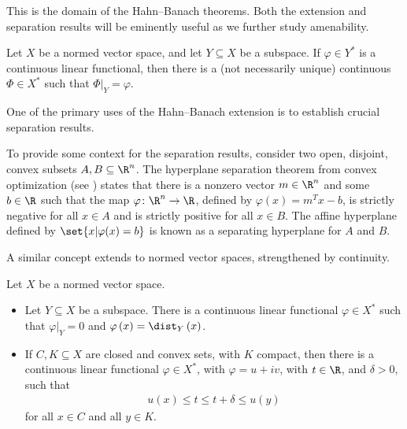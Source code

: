 \documentclass[10pt]{mypackage2}
\begin{document}
This is the domain of the Hahn--Banach theorems. Both the extension and separation results will be eminently useful as we further study amenability.
\begin{theorem}\label{thm:hahn_banach_extension}
  Let $X$ be a normed vector space, and let $Y\subseteq X$ be a subspace. If $\varphi\in Y^{\ast}$ is a continuous linear functional, then there is a (not necessarily unique) continuous $\Phi\in X^{\ast}$ such that $\Phi|_{Y} = \varphi$.
\end{theorem}
One of the primary uses of the Hahn--Banach extension is to establish crucial separation results.\newline

To provide some context for the separation results, consider two open, disjoint, convex subsets $A,B\subseteq \R^n$. The hyperplane separation theorem from convex optimization (see \cite[Chapter 2.6]{convex_optimization}) states that there is a nonzero vector $m\in \R^n$ and some $b\in \R$ such that the map $\varphi\colon \R^n\rightarrow \R$, defined by $\varphi(x) = m^{T}x - b$, is strictly negative for all $x\in A$ and is strictly positive for all $x\in B$. The affine hyperplane defined by $\set{x | \varphi(x) = b}$ is known as a separating hyperplane for $A$ and $B$.\newline

A similar concept extends to normed vector spaces, strengthened by continuity.
\begin{theorem}\label{thm:hahn_banach_separation}
  Let $X$ be a normed vector space. 
  \begin{itemize}
    \item Let $Y\subseteq X$ be a subspace. There is a continuous linear functional $\varphi\in X^{\ast}$ such that $\varphi|_{Y} = 0$ and $\varphi\left( x \right) = \dist_{Y}\left( x \right)$.
    \item If $C,K\subseteq X$ are closed and convex sets, with $K$ compact, then there is a continuous linear functional $\varphi\in X^{\ast}$, with $\varphi = u + iv$, with $t\in \R$, and $\delta > 0$, such that
      \begin{align*}
        u(x) \leq t \leq t + \delta \leq u(y)
      \end{align*}
      for all $x\in C$ and all $y\in K$.
  \end{itemize}
\end{theorem}
\end{document}
